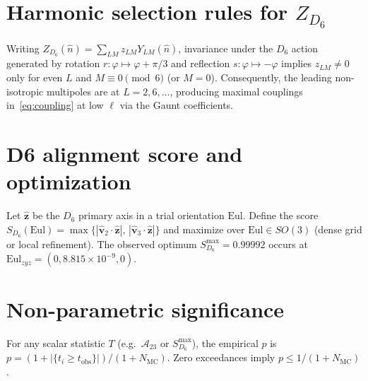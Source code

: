 \documentclass[reprint,aps,prl,twocolumn,nofootinbib,longbibliography]{revtex4-2}
\DeclareRobustCommand{\Eul}{\mathrm{Eul}}
\begin{document}
\appendix

\section{Harmonic selection rules for $Z_{D_6}$}\label{app:selection-rules}
Writing $Z_{D_6}(\hat{n})=\sum_{LM}z_{LM} Y_{LM}(\hat{n})$, invariance under the $D_6$ action generated by rotation $r:\varphi\mapsto\varphi+\pi/3$ and reflection $s:\varphi\mapsto-\varphi$ implies $z_{LM}\neq 0$ only for even $L$ and $M\equiv 0\pmod{6}$ (or $M=0$). Consequently, the leading non-isotropic multipoles are at $L=2,6,\dots$, producing maximal couplings in~\eqref{eq:coupling} at low $\ell$ via the Gaunt coefficients.

\section{D6 alignment score and optimization}\label{app:d6-fit}
Let $\hat{\bm{z}}$ be the $D_6$ primary axis in a trial orientation $\Eul$. Define the score $S_{D_6}(\Eul) = \max\{ |\hat{\bm v}_2\cdot \hat{\bm{z}}|,\, |\hat{\bm v}_3\cdot \hat{\bm{z}}| \}$ and maximize over $\Eul\in SO(3)$ (dense grid or local refinement). The observed optimum $S_{D_6}^{\max}=0.99992$ occurs at $\Eul_{zyz}=(0,8.815\times 10^{-9},0)$.

\section{Non-parametric significance}
For any scalar statistic $T$ (e.g.\ $\mathcal{A}_{23}$ or $S_{D_6}^{\max}$), the empirical $p$ is $p=(1+|\{t_i\ge t_{\mathrm{obs}}\}|)/(1+N_{\mathrm{MC}})$. Zero exceedances imply $p\le 1/(1+N_{\mathrm{MC}})$.
\end{document}
